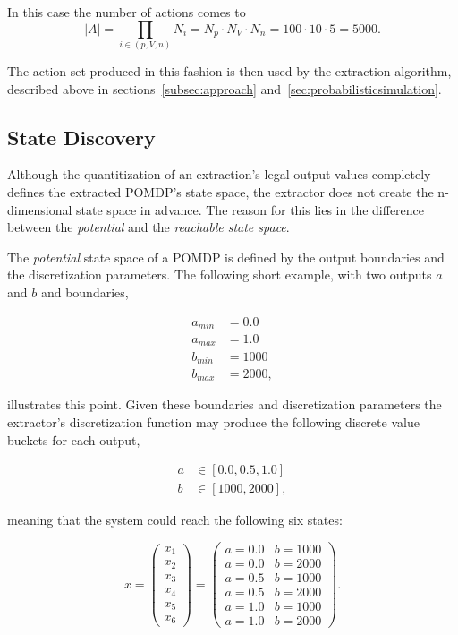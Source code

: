 In this case the number of actions comes to 
\[
|A| = \prod_{i \in (p,V,n)} N_i = N_p \cdot N_V \cdot N_n = 100 \cdot 10 \cdot 5 = 5000.
\]

The action set produced in this fashion is then used by the extraction algorithm, described above in sections~\ref{subsec:approach} and~\ref{sec:probabilisticsimulation}.

\subsection{State Discovery}
\label{subsec:statediscovery}

Although the quantitization of an extraction's legal output values completely defines the extracted POMDP's state space, the extractor does not create the n-dimensional state space in advance. The reason for this lies in the difference between the \textit{potential} and the \textit{reachable state space}.

The \textit{potential} state space of a POMDP is defined by the output boundaries and the discretization parameters. The following short example, with two outputs $a$ and $b$ and boundaries, 

\begin{align}
a_{min} &= 0.0 \nonumber\\
a_{max} &= 1.0 \nonumber\\
b_{min} &= 1000 \nonumber\\
b_{max} &= 2000 \nonumber,
\end{align}

illustrates this point. Given these boundaries and discretization parameters the extractor's discretization function may produce the following discrete value buckets for each output,

\begin{align}
a &\in [0.0,0.5,1.0] \nonumber \\
b &\in [1000,2000], \nonumber
\end{align}

meaning that the system could reach the following six states:

\[
x = 
\begin{pmatrix}
x_1 \\
x_2 \\
x_3 \\
x_4 \\
x_5 \\
x_6
\end{pmatrix}
=
\begin{pmatrix}
a = 0.0 & b = 1000 \\
a = 0.0 & b = 2000 \\
a = 0.5 & b = 1000 \\
a = 0.5 & b = 2000 \\
a = 1.0 & b = 1000 \\
a = 1.0 & b = 2000
\end{pmatrix}.
\]

